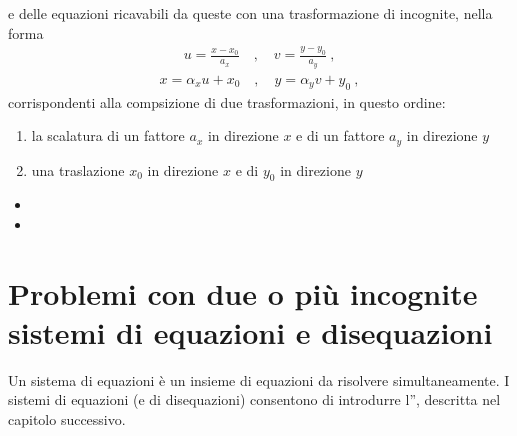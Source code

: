 \documentclass[letterpaper,10pt,italian]{jupyterBook}
\begin{document}
\sphinxAtStartPar
e delle equazioni ricavabili da queste con una trasformazione  di incognite, nella forma
\begin{equation*}
\begin{split} u = \frac{x-x_0}{a_x} \quad , \quad v = \frac{y-y_0}{a_y} \ ,\end{split}
\end{equation*}\begin{equation*}
\begin{split} x = \alpha_x u + x_0  \quad , \quad y = \alpha_y v + y_0 \ ,\end{split}
\end{equation*}
\sphinxAtStartPar
corrispondenti alla compsizione di due trasformazioni, in questo ordine:
\begin{enumerate}
%
\item {} 
\sphinxAtStartPar
la scalatura di un fattore \(a_x\) in direzione \(x\) e di un fattore \(a_y\) in direzione \(y\)

\item {} 
\sphinxAtStartPar
una traslazione \(x_0\) in direzione \(x\) e di \(y_0\) in direzione \(y\)

\end{enumerate}

\sphinxAtStartPar
{}
\begin{itemize}
\item {} 
\sphinxAtStartPar
{}

\item {} 
\sphinxAtStartPar
{}

\end{itemize}




\section{Problemi con due o più incognite \sphinxhyphen{} sistemi di equazioni e disequazioni}
\label{\detokenize{ch/algebra/real-algebra:problemi-con-due-o-piu-incognite-sistemi-di-equazioni-e-disequazioni}}
\sphinxAtStartPar
Un sistema di equazioni è un insieme di equazioni da risolvere simultaneamente. I sistemi di equazioni (e di disequazioni) consentono di introdurre l”{\hyperref[\detokenize{ch/algebra/real-n-algebra:math-hs-algebra-real-n}]{}}, descritta nel capitolo successivo.
\end{document}
